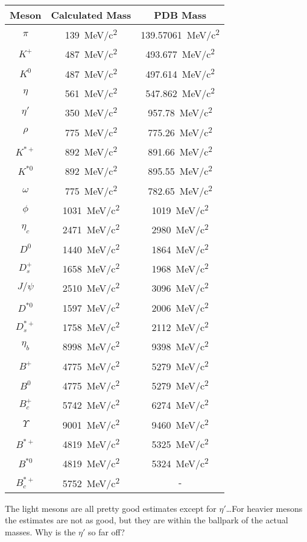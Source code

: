 \documentclass[../main.tex]{subfiles}
\begin{document}
\begin{center}
    \begin{tabular}{c c c}
        \hline
        Meson & Calculated Mass & PDB Mass \\
        \hline
        $\pi$ & \qty{139}{\MeV/c^2} & \qty{139.57061}{\MeV/c^2} \\
        $K^+$ & \qty{487}{\MeV/c^2} & \qty{493.677}{\MeV/c^2} \\
        $K^0$ & \qty{487}{\MeV/c^2} & \qty{497.614}{\MeV/c^2} \\
        $\eta$ & \qty{561}{\MeV/c^2} & \qty{547.862}{\MeV/c^2} \\
        $\eta'$ & \qty{350}{\MeV/c^2} & \qty{957.78}{\MeV/c^2} \\
        $\rho$ & \qty{775}{\MeV/c^2} & \qty{775.26}{\MeV/c^2} \\
        $K^{*+}$ & \qty{892}{\MeV/c^2} & \qty{891.66}{\MeV/c^2} \\
        $K^{*0}$ & \qty{892}{\MeV/c^2} & \qty{895.55}{\MeV/c^2} \\
        $\omega$ & \qty{775}{\MeV/c^2} & \qty{782.65}{\MeV/c^2} \\
        $\phi$ & \qty{1031}{\MeV/c^2} & \qty{1019}{\MeV/c^2} \\
        $\eta_c$ & \qty{2471}{\MeV/c^2} & \qty{2980}{\MeV/c^2} \\
        $D^0$ & \qty{1440}{\MeV/c^2} & \qty{1864}{\MeV/c^2} \\
        $D_s^+$ & \qty{1658}{\MeV/c^2} & \qty{1968}{\MeV/c^2} \\
        $J/\psi$ & \qty{2510}{\MeV/c^2} & \qty{3096}{\MeV/c^2} \\
        $D^{*0}$ & \qty{1597}{\MeV/c^2} & \qty{2006}{\MeV/c^2} \\
        $D_s^{*+}$ & \qty{1758}{\MeV/c^2} & \qty{2112}{\MeV/c^2} \\
        $\eta_b$ & \qty{8998}{\MeV/c^2} & \qty{9398}{\MeV/c^2} \\
        $B^+$ & \qty{4775}{\MeV/c^2} & \qty{5279}{\MeV/c^2} \\
        $B^0$ & \qty{4775}{\MeV/c^2} & \qty{5279}{\MeV/c^2} \\
        $B_c^+$ & \qty{5742}{\MeV/c^2} & \qty{6274}{\MeV/c^2} \\
        $\Upsilon$ & \qty{9001}{\MeV/c^2} & \qty{9460}{\MeV/c^2} \\
        $B^{*+}$ & \qty{4819}{\MeV/c^2} & \qty{5325}{\MeV/c^2} \\
        $B^{*0}$ & \qty{4819}{\MeV/c^2} & \qty{5324}{\MeV/c^2} \\
        $B_c^{*+}$ & \qty{5752}{\MeV/c^2} & - \\
        \hline
    \end{tabular}
\end{center}
The light mesons are all pretty good estimates except for $\eta'$\dots For heavier mesons the
estimates are not as good, but they are within the ballpark of the actual masses. Why is the $\eta'$
so far off? 
\end{document}
